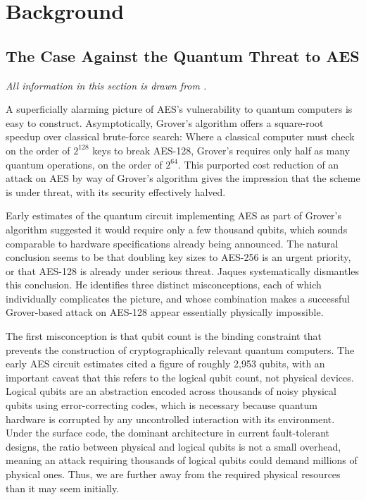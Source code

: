 \chapter{Background}\label{chap:background}

\section{The Case Against the Quantum Threat to AES}\label{sec:jaques}
\textit{All information in this section is drawn from \textcite{jaques2024ches_presentation}.}


A superficially alarming picture of AES's vulnerability to quantum computers is easy to construct. Asymptotically, Grover's algorithm offers a square-root speedup over classical brute-force search: Where a classical computer must check on the order of $2^{128}$ keys to break AES-128, Grover's requires only half as many quantum operations, on the order of $2^{64}$. This purported cost reduction of an attack on AES by way of Grover's algorithm gives the impression that the scheme is under threat, with its security effectively halved. 

Early estimates of the quantum circuit implementing AES %
as part of Grover's algorithm suggested it would require only a few thousand qubits, which sounds comparable to hardware specifications already being announced. The natural conclusion seems to be that doubling key sizes to AES-256 is an urgent priority, or that AES-128 is already under serious threat. Jaques systematically dismantles this conclusion. He identifies three distinct misconceptions, each of which individually complicates the picture, and whose combination makes a successful Grover-based attack on AES-128 appear essentially physically impossible.

The first misconception is that qubit count is the binding constraint that prevents the construction of cryptographically relevant quantum computers. The early AES circuit estimates cited a figure of roughly 2,953 qubits, with an important caveat that this refers to the logical qubit count, not physical devices. Logical qubits are an abstraction encoded across thousands of noisy physical qubits using error-correcting codes, which is necessary because quantum hardware is corrupted by any uncontrolled interaction with its environment. Under the surface code, the dominant architecture in current fault-tolerant designs, the ratio between physical and logical qubits is not a small overhead, meaning an attack requiring thousands of logical qubits could demand millions of physical ones. Thus, we are further away from the required physical resources than it may seem initially.

